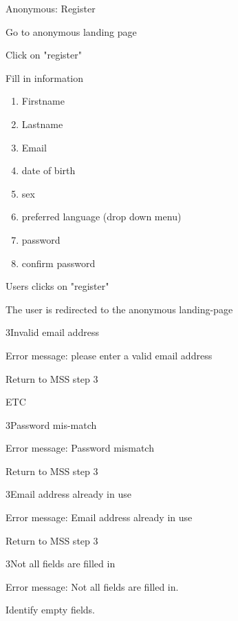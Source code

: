 \begin{uc}{Anonymous: Register}

    \begin{uc-mss}
   	\item Go to anonymous landing page
   	\item Click on "register"
   	\item Fill in information
   	\begin{enumerate}
   	\item Firstname
   	\item Lastname
   	\item Email
   	\item date of birth
   	\item sex
   	\item preferred language (drop down menu)
   	\item password
   	\item confirm password
   	\end{enumerate}
   	\item Users clicks on "register"
   	\item The user is redirected to the anonymous landing-page
    \end{uc-mss}

    \begin{uc-ext}

        \begin{uc-fail}{3}{Invalid email address}
        \item Error message: please enter a valid email address
        \item Return to MSS step 3
        \item ETC
        \end{uc-fail}
        
        \begin{uc-fail}{3}{Password mis-match}
        \item Error message: Password mismatch
        \item Return to MSS step 3
		\end{uc-fail}
		
		\begin{uc-fail}{3}{Email address already in use}
		\item Error message: Email address already in use
		\item Return to MSS step 3
		\end{uc-fail}
		
		\begin{uc-fail}{3}{Not all fields are filled in}
		\item Error message: Not all fields are filled in.
		\item Identify empty fields.
		\end{uc-fail}
	\end{uc-ext}
		

\end{uc}
